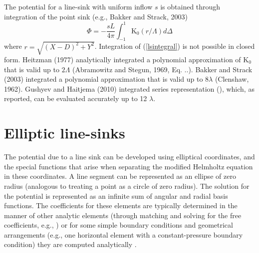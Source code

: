 \documentclass{elsart}
\begin{document}
The potential for a line-sink with uniform inflow $s$ is obtained through integration of the point sink (e.g., Bakker and Strack, 2003)
\begin{equation} \label{lsintegral}
\Phi = -\frac{sL}{4\pi} \int_{-1}^{1}\text{K}_0(r/\Lambda) d\Delta
\end{equation}
where $r=\sqrt{(X-D)^2+Y^2}$. Integration of (\ref{lsintegral}) is not possible in closed form. Heitzman (1977) analytically integrated a polynomial approximation of K$_0$ that is valid up to $2\Lambda$ (Abramowitz and Stegun, 1969, Eq. ..). Bakker and Strack (2003) integrated a polynomial approximation that is valid up to $8\lambda$ (Clenshaw, 1962). Gushyev and Haitjema (2010) integrated series representation (), which, as reported, can be evaluated accurately up to 12 $\lambda$.  

\section{Elliptic line-sinks}
The potential due to a line sink can be developed using elliptical coordinates, and the special functions that arise when separating the modified Helmholtz equation in these coordinates.  A line segment can be represented as an ellipse of zero radius (analogous to treating a point as a circle of zero radius).  The solution for the potential is represented as an infinite sum of angular and radial basis functions.  The coefficients for these elements are typically determined in the manner of other analytic elements (through matching and solving for the free coefficients, e.g., \cite{bakker2004two}) or for some simple boundary conditions and geometrical arrangements (e.g., one horizontal element with a constant-pressure boundary condition) they are computed analytically \cite{kuhlmanwarrick08}.
\end{document}
